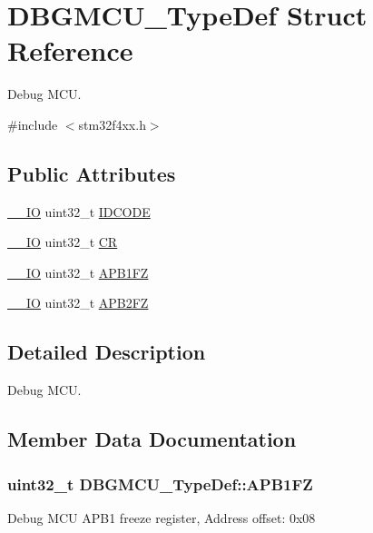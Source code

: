 \hypertarget{struct_d_b_g_m_c_u___type_def}{}\section{D\+B\+G\+M\+C\+U\+\_\+\+Type\+Def Struct Reference}
\label{struct_d_b_g_m_c_u___type_def}


Debug M\+CU.  




{\ttfamily \#include $<$stm32f4xx.\+h$>$}

\subsection*{Public Attributes}
\begin{DoxyCompactItemize}
\item 
\hyperlink{core__cm4_8h_aec43007d9998a0a0e01faede4133d6be}{\+\_\+\+\_\+\+IO} uint32\+\_\+t \hyperlink{struct_d_b_g_m_c_u___type_def_a0cc3561c124d06bb57dfa855e43ed99f}{I\+D\+C\+O\+DE}
\item 
\hyperlink{core__cm4_8h_aec43007d9998a0a0e01faede4133d6be}{\+\_\+\+\_\+\+IO} uint32\+\_\+t \hyperlink{struct_d_b_g_m_c_u___type_def_a15981828f2b915d38570cf6684e99a53}{CR}
\item 
\hyperlink{core__cm4_8h_aec43007d9998a0a0e01faede4133d6be}{\+\_\+\+\_\+\+IO} uint32\+\_\+t \hyperlink{struct_d_b_g_m_c_u___type_def_aac341c7e09cd5224327eeb7d9f122bed}{A\+P\+B1\+FZ}
\item 
\hyperlink{core__cm4_8h_aec43007d9998a0a0e01faede4133d6be}{\+\_\+\+\_\+\+IO} uint32\+\_\+t \hyperlink{struct_d_b_g_m_c_u___type_def_a011f892d86367dbe786964b14bc515a6}{A\+P\+B2\+FZ}
\end{DoxyCompactItemize}


\subsection{Detailed Description}
Debug M\+CU. 

\subsection{Member Data Documentation}
\subsubsection[{\texorpdfstring{A\+P\+B1\+FZ}{APB1FZ}}]{ uint32\+\_\+t D\+B\+G\+M\+C\+U\+\_\+\+Type\+Def\+::\+A\+P\+B1\+FZ}\hypertarget{struct_d_b_g_m_c_u___type_def_aac341c7e09cd5224327eeb7d9f122bed}{}\label{struct_d_b_g_m_c_u___type_def_aac341c7e09cd5224327eeb7d9f122bed}
Debug M\+CU A\+P\+B1 freeze register, Address offset\+: 0x08 
